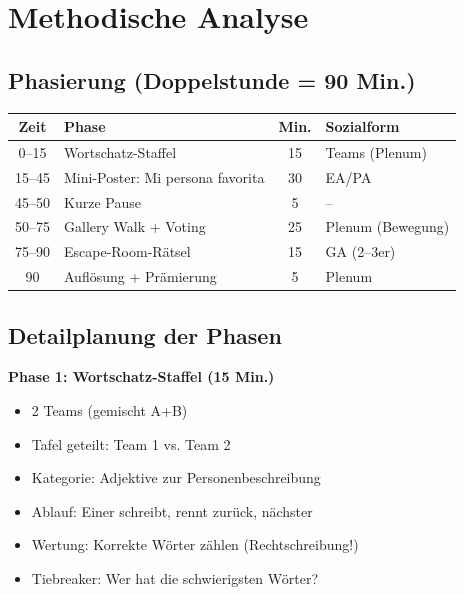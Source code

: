 \documentclass[11pt,a4paper]{article}
\begin{document}
\section{Methodische Analyse}

\subsection{Phasierung (Doppelstunde = 90 Min.)}

\begin{center}
\begin{tabular}{|c|l|c|l|}
\hline
\textbf{Zeit} & \textbf{Phase} & \textbf{Min.} & \textbf{Sozialform} \\
\hline
0--15 & Wortschatz-Staffel & 15 & Teams (Plenum) \\
\hline
15--45 & Mini-Poster: \glqq{}Mi persona favorita\grqq{} & 30 & EA/PA \\
\hline
45--50 & Kurze Pause & 5 & -- \\
\hline
50--75 & Gallery Walk + Voting & 25 & Plenum (Bewegung) \\
\hline
75--90 & Escape-Room-Rätsel & 15 & GA (2--3er) \\
\hline
\rowcolor{lightgray} 90 & Auflösung + Prämierung & 5 & Plenum \\
\hline
\end{tabular}
\end{center}

\subsection{Detailplanung der Phasen}

\textbf{Phase 1: Wortschatz-Staffel (15 Min.)}
\begin{itemize}
    \item 2 Teams (gemischt A+B)
    \item Tafel geteilt: \glqq{}Team 1\grqq{} vs. \glqq{}Team 2\grqq{}
    \item Kategorie: \glqq{}Adjektive zur Personenbeschreibung\grqq{}
    \item Ablauf: Einer schreibt, rennt zurück, nächster
    \item Wertung: Korrekte Wörter zählen (Rechtschreibung!)
    \item Tiebreaker: Wer hat die \glqq{}schwierigsten\grqq{} Wörter?
\end{itemize}
\end{document}
